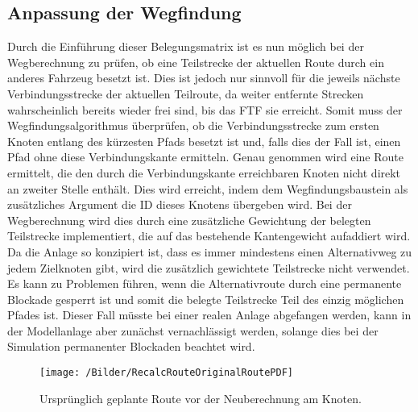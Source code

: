 	\subsection{Anpassung der Wegfindung}
		Durch die Einführung dieser Belegungsmatrix ist es nun möglich bei der Wegberechnung zu prüfen, ob eine Teilstrecke der aktuellen Route durch ein anderes Fahrzeug besetzt ist. Dies ist jedoch nur sinnvoll für die jeweils nächste Verbindungsstrecke der aktuellen Teilroute, da weiter entfernte Strecken wahrscheinlich bereits wieder frei sind, bis das \ac{FTF} sie erreicht. Somit muss der Wegfindungsalgorithmus überprüfen, ob die Verbindungsstrecke zum ersten Knoten entlang des kürzesten Pfads besetzt ist und, falls dies der Fall ist, einen Pfad ohne diese Verbindungskante ermitteln. Genau genommen wird eine Route ermittelt, die den durch die Verbindungskante erreichbaren Knoten nicht direkt an zweiter Stelle enthält. Dies wird erreicht, indem dem Wegfindungsbaustein als zusätzliches Argument die ID dieses Knotens übergeben wird. Bei der Wegberechnung wird dies durch eine zusätzliche Gewichtung der belegten Teilstrecke implementiert, die auf das bestehende Kantengewicht aufaddiert wird. Da die Anlage so konzipiert ist, dass es immer mindestens einen Alternativweg zu jedem Zielknoten gibt, wird die zusätzlich gewichtete Teilstrecke nicht verwendet. Es kann zu Problemen führen, wenn die Alternativroute durch eine permanente Blockade gesperrt ist und somit die belegte Teilstrecke Teil des einzig möglichen Pfades ist. Dieser Fall müsste bei einer realen Anlage abgefangen werden, kann in der Modellanlage aber zunächst vernachlässigt werden, solange dies bei der Simulation permanenter Blockaden beachtet wird.
		
		\begin{figure}[h]
			\centering
			\texttt{[image: /Bilder/RecalcRouteOriginalRoutePDF]}
			\vspace{0.2cm}
			\caption{Ursprünglich geplante Route vor der Neuberechnung am Knoten.}\label{RecalcOrig}
		\end{figure}
		
